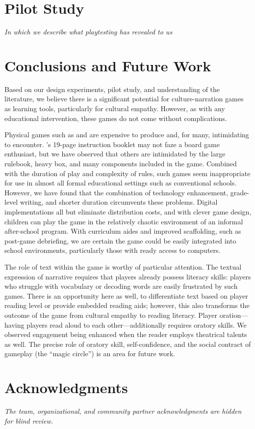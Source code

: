 \documentclass[a4paper]{article}
\begin{document}
\section{Pilot Study}

\textit{In which we describe what playtesting has revealed to us}

\section{Conclusions and Future Work}

Based on our design experiments, pilot study, and understanding of the
literature, we believe there is a significant potential for
culture-narration games as learning tools, particularly for
cultural empathy.
However, as with any educational intervention, these games do not
come without complications.

Physical games such as \totan{} and \smersh{} are expensive to produce
and, for many, intimidating to encounter. \totan{}'s 19-page
instruction booklet may not faze a board game enthusiast, but we have
observed that others are intimidated by the large rulebook, heavy box,
and many components included in the game. Combined with the duration
of play and complexity of rules, such games seem inappropriate for use
in almost all formal educational settings such as conventional
schools.  However, we have found that the combination of technology
enhancement, grade-level writing, and shorter duration circumvents
these problems.  Digital implementations all but eliminate
distribution costs, and with clever game design, children can play the
game in the relatively chaotic environment of an informal after-school
program. With curriculum aides and improved scaffolding, such as
post-game debriefing, we are certain the game could be easily
integrated into school environments, particularly those with
ready access to computers.

The role of text within the game is worthy of particular attention.
The textual expression of narrative requires that players already possess
literacy skills: players who struggle with vocabulary or decoding words
are easily frustrated by such games. There is an opportunity
here as well, to differentiate text based on player reading level
or provide embedded reading aids; however, this also transforms
the outcome of the game from cultural empathy to reading literacy.
Player oration---having players read aloud to each
other---additionally requires oratory skills. We observed engagement
being enhanced when the reader employs theatrical talents as well.
The precise role of oratory skill, self-confidence, and the social
contract of gameplay (the ``magic circle'') is an area for future work.


\section{Acknowledgments}
\textit{The team, organizational, and community partner
  acknowledgments are hidden for blind review.}



\end{document}
